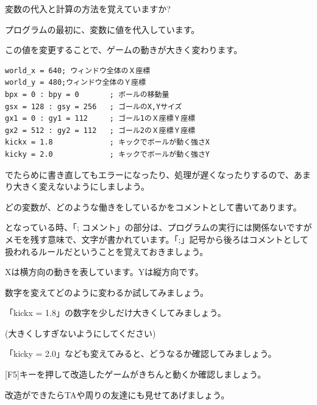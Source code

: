 変数の代入と計算の方法を覚えていますか?



プログラムの最初に、変数に値を代入しています。

この値を変更することで、ゲームの動きが大きく変わります。


\begin{lstlisting}[firstnumber=3,caption=ミニサッカーゲームのプログラムの一部]
world_x = 640; ウィンドウ全体のＸ座標
world_y = 480;ウィンドウ全体のＹ座標
bpx = 0 : bpy = 0       ; ボールの移動量
gsx = 128 : gsy = 256   ; ゴールのX,Yサイズ
gx1 = 0 : gy1 = 112     ; ゴール1のＸ座標Ｙ座標
gx2 = 512 : gy2 = 112   ; ゴール2のＸ座標Ｙ座標
kickx = 1.8             ; キックでボールが動く強さX
kicky = 2.0             ; キックでボールが動く強さY
\end{lstlisting}


でたらめに書き直してもエラーになったり、処理が遅くなったりするので、あまり大きく変えないようにしましよう。

どの変数が、どのような働きをしているかをコメントとして書いてあります。



となっている時、「; コメント」の部分は、プログラムの実行には関係ないですがメモを残す意味で、文字が書かれています。「;」記号から後ろはコメントとして扱われるルールだということを覚えておきましょう。

Xは横方向の動きを表しています。Yは縦方向です。

数字を変えてどのように変わるか試してみましょう。


\exampleanswer



「kickx = 1.8」の数字を少しだけ大きくしてみましょう。

(大きくしすぎないようにしてください)

「kicky = 2.0」なども変えてみると、どうなるか確認してみましょう。



[F5]キーを押して改造したゲームがきちんと動くか確認しましょう。

改造ができたらTAや周りの友達にも見せてあげましょう。

